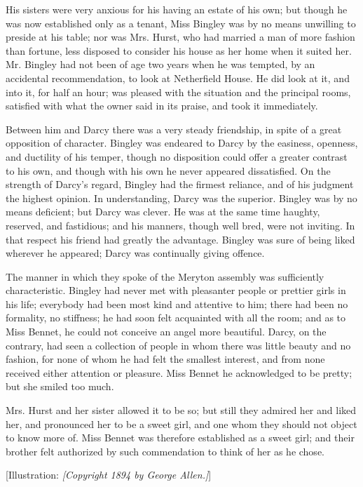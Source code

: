 \documentclass[12pt]{book}
\begin{document}
His sisters were very anxious for his having an estate of his own; but though he was now established only as a tenant, Miss Bingley was by no means unwilling to preside at his table; nor was Mrs. Hurst, who had married a man of more fashion than fortune, less disposed to consider his house as her home when it suited her. Mr. Bingley had not been of age two years when he was tempted, by an accidental recommendation, to look at Netherfield House. He did look at it, and into it, for half an hour; was pleased with the situation and the principal rooms, satisfied with what the owner said in its praise, and took it immediately.

Between him and Darcy there was a very steady friendship, in spite of a great opposition of character. Bingley was endeared to Darcy by the easiness, openness, and ductility of his temper, though no disposition could offer a greater contrast to his own, and though with his own he never appeared dissatisfied. On the strength of Darcy's regard, Bingley had the firmest reliance, and of his judgment the highest opinion. In understanding, Darcy was the superior. Bingley was by no means deficient; but Darcy was clever. He was at the same time haughty, reserved, and fastidious; and his manners, though well bred, were not inviting. In that respect his friend had greatly the advantage. Bingley was sure of being liked wherever he appeared; Darcy was continually giving offence.

The manner in which they spoke of the Meryton assembly was sufficiently characteristic. Bingley had never met with pleasanter people or prettier girls in his life; everybody had been most kind and attentive to him; there had been no formality, no stiffness; he had soon felt acquainted with all the room; and as to Miss Bennet, he could not conceive an angel more beautiful. Darcy, on the contrary, had seen a collection of people in whom there was little beauty and no fashion, for none of whom he had felt the smallest interest, and from none received either attention or pleasure. Miss Bennet he acknowledged to be pretty; but she smiled too much.

Mrs. Hurst and her sister allowed it to be so; but still they admired her and liked her, and pronounced her to be a sweet girl, and one whom they should not object to know more of. Miss Bennet was therefore established as a sweet girl; and their brother felt authorized by such commendation to think of her as he chose.

[Illustration: \emph{[\textit{Copyright 1894 by George Allen.}]}]
\end{document}
